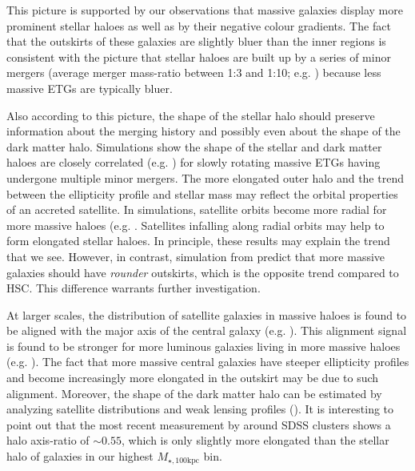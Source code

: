 \documentclass[fleqn,usenatbib]{mnras}
\def\mtot{{$M_{\star,100\mathrm{kpc}}$}}
\begin{document}
    This picture is supported by our observations that massive galaxies display more 
    prominent stellar haloes as well as by their negative colour gradients. 
    The fact that the outskirts of these galaxies are slightly bluer than the inner
    regions is consistent with the picture that stellar haloes are built up by a
    series of minor mergers (average merger mass-ratio between 1:3 and 1:10; e.g. 
    \citealt{Huang2016}) because less massive ETGs are typically bluer. 

    Also according to this picture, the shape of the stellar halo should preserve
    information about the merging history and possibly even about the shape of the 
    dark matter halo. 
    Simulations show the shape of the stellar and dark matter haloes are closely 
    correlated (e.g. \citealt{Wu2014}) for slowly rotating massive ETGs having 
    undergone multiple minor mergers.
    The more elongated outer halo and the trend between the ellipticity profile and 
    stellar mass may reflect the orbital properties of an accreted satellite. 
    In simulations, satellite orbits become more radial for more massive haloes 
    (e.g. \citealt{Murante2007, Wetzel2011, Jiang2015}. 
    Satellites infalling along radial orbits may help to form elongated stellar 
    haloes.
    In principle, these results may explain the trend that we see. 
    However, in contrast, simulation from \citet{Wu2014} predict that more massive 
    galaxies should have \emph{rounder} outskirts, which is the opposite trend 
    compared to HSC. 
    This difference warrants further investigation.
    
    At larger scales, the distribution of satellite galaxies in massive haloes is 
    found to be aligned with the major axis of the central galaxy 
    (e.g. \citealt{Brainerd2005, Yang2006b, NiedersteOstholt2010, 
    HuangMandelbaum2016}). 
    This alignment signal is found to be stronger for more luminous galaxies 
    living in more massive haloes (e.g. \citealt{Hirata2007}).
    The fact that more massive central galaxies have steeper ellipticity profiles 
    and become increasingly more elongated in the outskirt may be due to 
    such alignment. 
    Moreover, the shape of the dark matter halo can be estimated by analyzing 
    satellite distributions and weak lensing profiles (\citealt{ClampittJain2016}). 
    It is interesting to point out that the most recent measurement by 
    \citet{Shin2017} around SDSS clusters shows a halo axis-ratio of ${\sim}0.55$, 
    which is only slightly more elongated than the stellar halo of galaxies in our 
    highest \mtot{} bin.
    
\end{document}

